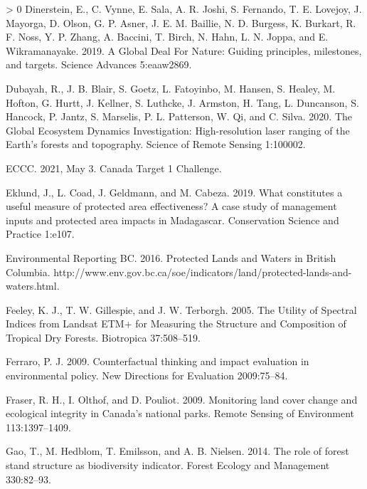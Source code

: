 \documentclass[11pt]{article}
\newlength{\cslhangindent}
\newenvironment{CSLReferences}[3] %
 {%
  \setlength{\parindent}{0pt}
  \ifodd #1 \everypar{\setlength{\hangindent}{\cslhangindent}}\ignorespaces\fi
  \ifnum #2 > 0
  \setlength{\parskip}{#2\baselineskip}
  \fi
 }%
 {}
\begin{document}
\begin{CSLReferences}{1}{0}
\leavevmode\hypertarget{ref-dinerstein2019}{}%
Dinerstein, E., C. Vynne, E. Sala, A. R. Joshi, S. Fernando, T. E.
Lovejoy, J. Mayorga, D. Olson, G. P. Asner, J. E. M. Baillie, N. D.
Burgess, K. Burkart, R. F. Noss, Y. P. Zhang, A. Baccini, T. Birch, N.
Hahn, L. N. Joppa, and E. Wikramanayake. 2019. A Global Deal For Nature:
Guiding principles, milestones, and targets. Science Advances
5:eaaw2869.

\leavevmode\hypertarget{ref-dubayahGlobalEcosystemDynamics2020}{}%
Dubayah, R., J. B. Blair, S. Goetz, L. Fatoyinbo, M. Hansen, S. Healey,
M. Hofton, G. Hurtt, J. Kellner, S. Luthcke, J. Armston, H. Tang, L.
Duncanson, S. Hancock, P. Jantz, S. Marselis, P. L. Patterson, W. Qi,
and C. Silva. 2020. The Global Ecosystem Dynamics Investigation:
High-resolution laser ranging of the Earth's forests and topography.
Science of Remote Sensing 1:100002.

\leavevmode\hypertarget{ref-eccc2021}{}%
ECCC. 2021, May 3. Canada Target 1 Challenge.

\leavevmode\hypertarget{ref-eklundWhatConstitutesUseful2019}{}%
Eklund, J., L. Coad, J. Geldmann, and M. Cabeza. 2019. What constitutes
a useful measure of protected area effectiveness? A case study of
management inputs and protected area impacts in Madagascar. Conservation
Science and Practice 1:e107.

\leavevmode\hypertarget{ref-environmentalreportingbc2016}{}%
Environmental Reporting BC. 2016. Protected Lands and Waters in British
Columbia.
http://www.env.gov.bc.ca/soe/indicators/land/protected-lands-and-waters.html.

\leavevmode\hypertarget{ref-feeley2005}{}%
Feeley, K. J., T. W. Gillespie, and J. W. Terborgh. 2005. The Utility of
Spectral Indices from Landsat ETM+ for Measuring the Structure and
Composition of Tropical Dry Forests. Biotropica 37:508--519.

\leavevmode\hypertarget{ref-ferraroCounterfactualThinkingImpact2009}{}%
Ferraro, P. J. 2009. Counterfactual thinking and impact evaluation in
environmental policy. New Directions for Evaluation 2009:75--84.

\leavevmode\hypertarget{ref-fraserMonitoringLandCover2009}{}%
Fraser, R. H., I. Olthof, and D. Pouliot. 2009. Monitoring land cover
change and ecological integrity in Canada's national parks. Remote
Sensing of Environment 113:1397--1409.

\leavevmode\hypertarget{ref-gao2014}{}%
Gao, T., M. Hedblom, T. Emilsson, and A. B. Nielsen. 2014. The role of
forest stand structure as biodiversity indicator. Forest Ecology and
Management 330:82--93.


\end{CSLReferences}
\end{document}
